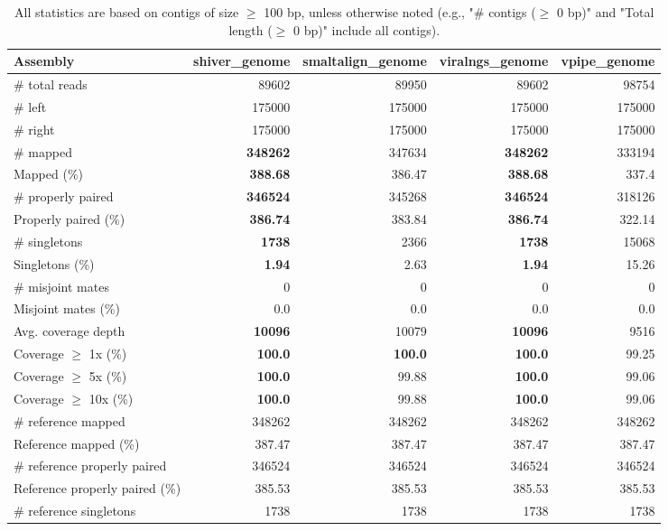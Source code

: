 \documentclass[12pt,a4paper]{article}
\begin{document}
\begin{table}[ht]
\begin{center}
\caption{All statistics are based on contigs of size $\geq$ 100 bp, unless otherwise noted (e.g., "\# contigs ($\geq$ 0 bp)" and "Total length ($\geq$ 0 bp)" include all contigs).}
\begin{tabular}{|l*{4}{|r}|}
\hline
Assembly & shiver\_genome & smaltalign\_genome & viralngs\_genome & vpipe\_genome \\ \hline
\# total reads & 89602 & 89950 & 89602 & 98754 \\ \hline
\# left & 175000 & 175000 & 175000 & 175000 \\ \hline
\# right & 175000 & 175000 & 175000 & 175000 \\ \hline
\# mapped & {\bf 348262} & 347634 & {\bf 348262} & 333194 \\ \hline
Mapped (\%) & {\bf 388.68} & 386.47 & {\bf 388.68} & 337.4 \\ \hline
\# properly paired & {\bf 346524} & 345268 & {\bf 346524} & 318126 \\ \hline
Properly paired (\%) & {\bf 386.74} & 383.84 & {\bf 386.74} & 322.14 \\ \hline
\# singletons & {\bf 1738} & 2366 & {\bf 1738} & 15068 \\ \hline
Singletons (\%) & {\bf 1.94} & 2.63 & {\bf 1.94} & 15.26 \\ \hline
\# misjoint mates & 0 & 0 & 0 & 0 \\ \hline
Misjoint mates (\%) & 0.0 & 0.0 & 0.0 & 0.0 \\ \hline
Avg. coverage depth & {\bf 10096} & 10079 & {\bf 10096} & 9516 \\ \hline
Coverage $\geq$ 1x (\%) & {\bf 100.0} & {\bf 100.0} & {\bf 100.0} & 99.25 \\ \hline
Coverage $\geq$ 5x (\%) & {\bf 100.0} & 99.88 & {\bf 100.0} & 99.06 \\ \hline
Coverage $\geq$ 10x (\%) & {\bf 100.0} & 99.88 & {\bf 100.0} & 99.06 \\ \hline
\# reference mapped & 348262 & 348262 & 348262 & 348262 \\ \hline
Reference mapped (\%) & 387.47 & 387.47 & 387.47 & 387.47 \\ \hline
\# reference properly paired & 346524 & 346524 & 346524 & 346524 \\ \hline
Reference properly paired (\%) & 385.53 & 385.53 & 385.53 & 385.53 \\ \hline
\# reference singletons & 1738 & 1738 & 1738 & 1738 \\ \hline

\end{tabular}
\end{center}
\end{table}
\end{document}
